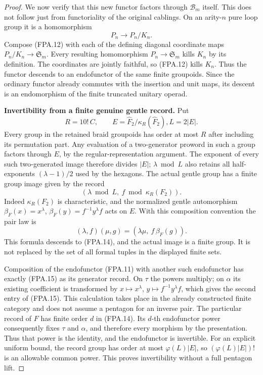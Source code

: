 \begin{proof}
We now verify that this new functor factors through
$\mathcal B_m$ itself.  This does not follow just from
functoriality of the original cablings.
On an arity-$n$ pure loop group it is a homomorphism
\[
                         P_n\longrightarrow P_n/K_n.
                                                               \tag{FPA.12}
\]
Compose (FPA.12) with each of the defining diagonal
coordinate maps $P_n/K_n\to\mathfrak S_m$.
Every resulting homomorphism $P_n\to\mathfrak S_m$
kills $K_n$ by its definition.  The coordinates are
jointly faithful, so (FPA.12) kills $K_n$.
Thus the functor descends to an endofunctor of the same
finite groupoids.  Since the ordinary functor already
commutes with the insertion and unit maps, its descent
is an endomorphism of the finite truncated unitary
operad.

\par\medskip\noindent\textbf{Invertibility from a finite genuine gentle record.}\quad
Put
\[
 R=10!\,C,\qquad E=\widehat F_2/\kappa_R(\widehat F_2),
                       L=2|E|.                        \tag{FPA.13}
\]
Every group in the retained braid groupoids has order
at most $R$ after including its permutation part.
Any evaluation of a two-generator proword in such a
group factors through $E$, by the regular-representation
argument.  The exponent of every such two-generated
image therefore divides $|E|$; $\lambda\bmod L$ also
retains all half-exponents $(\lambda-1)/2$ used by the
hexagons.
The actual gentle group has a finite group image given
by the record
\[
                  (\lambda\bmod L,\ f\bmod\kappa_R(F_2)).
                                                               \tag{FPA.14}
\]
Indeed $\kappa_R(F_2)$ is characteristic, and the
normalized gentle automorphism
$\beta_F(x)=x^\lambda$, $\beta_F(y)=f^{-1}y^\lambda f$
acts on $E$.  With this composition convention the
pair law is
\[
 (\lambda,f)(\mu,g)
             =(\lambda\mu,\ f\,\beta_F(g)).            \tag{FPA.15}
\]
This formula descends to (FPA.14), and the actual image
is a finite group.  It is not replaced by the set of
all formal tuples in the displayed finite sets.

Composition of the endofunctor (FPA.11) with another
such endofunctor has exactly (FPA.15) as its generator
record.  On $\tau$ the powers multiply; on $\alpha$
its existing coefficient is transformed by
$x\mapsto x^\lambda$, $y\mapsto f^{-1}y^\lambda f$,
which gives the second entry of (FPA.15).
This calculation takes place in the already constructed
finite category and does not assume a pentagon for an
inverse pair.
The particular record of $F$ has finite order $d$ in
(FPA.14).  Its $d$-th endofunctor power consequently
fixes $\tau$ and $\alpha$, and therefore every morphism
by the presentation.  Thus that power is the identity,
and the endofunctor is invertible.
For an explicit uniform bound, the record group has
order at most $\varphi(L)|E|$, so
$(\varphi(L)|E|)!$ is an allowable common power.
This proves invertibility without a full pentagon lift.


\end{proof}
